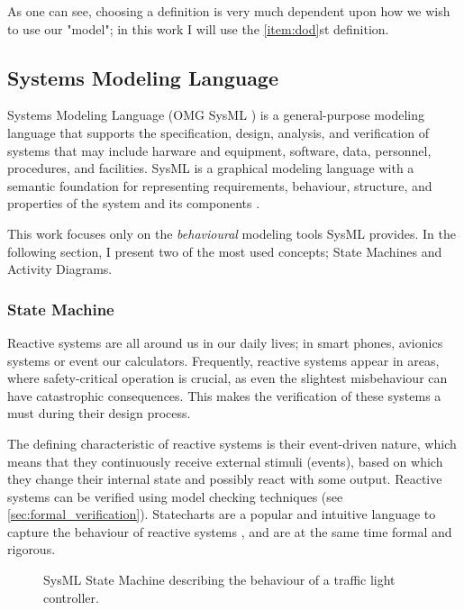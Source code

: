As one can see, choosing a definition is very much dependent upon how we wish to use our "model"; in this work I will use the \ref{item:dod}st definition.

\subsection{Systems Modeling Language}\label{ssec:sysml}

Systems Modeling Language (OMG SysML \cite{omg_sysml}) is a general-purpose modeling language that supports the specification, design, analysis, and verification of systems that may include harware and equipment, software, data, personnel, procedures, and facilities. SysML is a graphical modeling language with a semantic foundation for representing requirements, behaviour, structure, and properties of the system and its components \cite{sysml_practical_guide}.

This work focuses only on the \emph{behavioural} modeling tools SysML provides. In the following section, I present two of the most used concepts; State Machines and Activity Diagrams.

\subsubsection{State Machine}

Reactive systems are all around us in our daily lives; in smart phones, avionics systems or event our calculators. Frequently, reactive systems appear in areas, where safety-critical operation is crucial, as even the slightest
misbehaviour can have catastrophic consequences. This makes the verification of these systems a must during their design process.

The defining characteristic of reactive systems is their event-driven nature, which means that they continuously receive external stimuli (events), based on which they change their internal state and possibly react with some output\cite{10.1007/978-3-642-82453-1_17}. Reactive systems can be verified using model checking techniques (see \autoref{sec:formal_verification}). Statecharts \cite{HAREL1987231} are a popular and intuitive language to capture the behaviour of reactive systems \cite{10.1145/3417990.3421407, 10.1007/978-3-319-11653-2_10}, and are at the same time formal and rigorous. 

\begin{figure}[!ht]
	\centering
	
	\caption{SysML State Machine describing the behaviour of a traffic light controller.}
	\label{fig:sysml_state_machine}
\end{figure}

